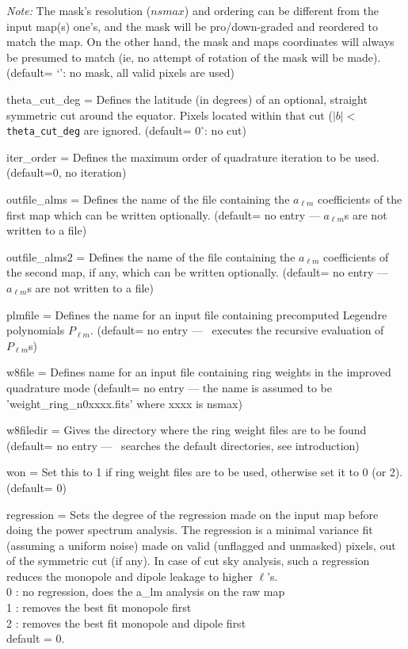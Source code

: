 \begin{qualifiers}
\begin{qulist}{}
{\em Note:} The mask's resolution ($nsmax$) and ordering can be different from the input map(s)
one's, and the mask will be pro/down-graded and reordered to match the map. On the
other hand, the mask and maps coordinates will always be presumed to match (ie, no
attempt of rotation of the mask will be made).
(default= `': no mask, all valid pixels are used)
 \item[{theta\_cut\_deg = }]%
 Defines the latitude (in degrees) of 
an optional, straight symmetric cut around the equator.  Pixels located within
that cut ($|b|<${\tt theta\_cut\_deg} are ignored.
(default= $0^\circ$: no cut)
 \item[{iter\_order = }]%
 Defines the maximum order of quadrature 
iteration to be used. (default=0, no iteration)
 \item[{outfile\_alms = }]%
 Defines the name of the file 
containing the $a_{\ell m}$  coefficients of the first map
which can be written optionally.   (default= no entry ---
$a_{\ell m}$s are not written to a file)
 \item[{outfile\_alms2 = }]%
 Defines the name of the file 
containing the $a_{\ell m}$  coefficients of the second map, if any,
which can be written optionally.   (default= no entry ---
$a_{\ell m}$s are not written to a file)
 \item[{plmfile = }]%
 Defines the name for an input file
    containing  precomputed Legendre polynomials $P_{\ell m}$.
(default= no entry --- \thedocid\ executes the recursive evaluation 
of $P_{\ell m}$s)
\item[{w8file = }]%
 Defines name for an input file containing ring
  weights in the improved quadrature mode (default= no entry ---
the name is assumed to be 'weight\_ring\_n0xxxx.fits' where xxxx is nsmax)
\item[{w8filedir = }]%
 Gives the directory where the ring weight files are
to be found (default= no entry --- \thedocid\ searches the default
directories, see introduction)
\item[{won = }]%
 Set this to 1 if ring weight files are to be used,
otherwise set it to 0 (or 2). (default= 0)
\item[{regression = }]%
 {{Sets the degree of the regression made on the
input map before doing the power spectrum analysis. 
The regression is a minimal variance fit (assuming a uniform noise) 
made on valid (unflagged and unmasked) pixels, out of the symmetric cut (if
any). In case of cut sky analysis, such a regression reduces the monopole
and dipole leakage to higher $\ell$'s.\\
0 : no regression, does the a\_lm analysis on the raw map\\
1 : removes the best fit monopole first\\
2 : removes the best fit monopole and dipole first\\
default = 0.}}
 

\end{qulist}
\end{qualifiers}
